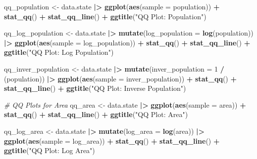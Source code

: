 \documentclass[
]{article}
\newenvironment{Shaded}{\begin{snugshade}}{\end{snugshade}}
\newcommand{\AttributeTok}[1]{\textcolor[rgb]{0.13,0.29,0.53}{#1}}
\newcommand{\CommentTok}[1]{\textcolor[rgb]{0.56,0.35,0.01}{\textit{#1}}}
\newcommand{\DecValTok}[1]{\textcolor[rgb]{0.00,0.00,0.81}{#1}}
\newcommand{\FunctionTok}[1]{\textcolor[rgb]{0.13,0.29,0.53}{\textbf{#1}}}
\newcommand{\NormalTok}[1]{#1}
\newcommand{\OtherTok}[1]{\textcolor[rgb]{0.56,0.35,0.01}{#1}}
\newcommand{\SpecialCharTok}[1]{\textcolor[rgb]{0.81,0.36,0.00}{\textbf{#1}}}
\newcommand{\StringTok}[1]{\textcolor[rgb]{0.31,0.60,0.02}{#1}}
\begin{document}
\begin{Shaded}
\begin{Highlighting}[]
\NormalTok{qq\_population }\OtherTok{\textless{}{-}}\NormalTok{ data.state }\SpecialCharTok{|\textgreater{}}
  \FunctionTok{ggplot}\NormalTok{(}\FunctionTok{aes}\NormalTok{(}\AttributeTok{sample =}\NormalTok{ population)) }\SpecialCharTok{+}
  \FunctionTok{stat\_qq}\NormalTok{() }\SpecialCharTok{+}
  \FunctionTok{stat\_qq\_line}\NormalTok{() }\SpecialCharTok{+}
  \FunctionTok{ggtitle}\NormalTok{(}\StringTok{"QQ Plot: Population"}\NormalTok{)}

\NormalTok{qq\_log\_population }\OtherTok{\textless{}{-}}\NormalTok{ data.state }\SpecialCharTok{|\textgreater{}}
  \FunctionTok{mutate}\NormalTok{(}\AttributeTok{log\_population =} \FunctionTok{log}\NormalTok{(population)) }\SpecialCharTok{|\textgreater{}}
  \FunctionTok{ggplot}\NormalTok{(}\FunctionTok{aes}\NormalTok{(}\AttributeTok{sample =}\NormalTok{ log\_population)) }\SpecialCharTok{+}
  \FunctionTok{stat\_qq}\NormalTok{() }\SpecialCharTok{+}
  \FunctionTok{stat\_qq\_line}\NormalTok{() }\SpecialCharTok{+}
  \FunctionTok{ggtitle}\NormalTok{(}\StringTok{"QQ Plot: Log Population"}\NormalTok{)}

\NormalTok{qq\_inver\_population }\OtherTok{\textless{}{-}}\NormalTok{ data.state }\SpecialCharTok{|\textgreater{}}
  \FunctionTok{mutate}\NormalTok{(}\AttributeTok{inver\_population =} \DecValTok{1} \SpecialCharTok{/}\NormalTok{ (population)) }\SpecialCharTok{|\textgreater{}}
  \FunctionTok{ggplot}\NormalTok{(}\FunctionTok{aes}\NormalTok{(}\AttributeTok{sample =}\NormalTok{ inver\_population)) }\SpecialCharTok{+}
  \FunctionTok{stat\_qq}\NormalTok{() }\SpecialCharTok{+}
  \FunctionTok{stat\_qq\_line}\NormalTok{() }\SpecialCharTok{+}
  \FunctionTok{ggtitle}\NormalTok{(}\StringTok{"QQ Plot: Inverse Population"}\NormalTok{)}

\CommentTok{\# QQ Plots for Area}
\NormalTok{qq\_area }\OtherTok{\textless{}{-}}\NormalTok{ data.state }\SpecialCharTok{|\textgreater{}}
  \FunctionTok{ggplot}\NormalTok{(}\FunctionTok{aes}\NormalTok{(}\AttributeTok{sample =}\NormalTok{ area)) }\SpecialCharTok{+}
  \FunctionTok{stat\_qq}\NormalTok{() }\SpecialCharTok{+}
  \FunctionTok{stat\_qq\_line}\NormalTok{() }\SpecialCharTok{+}
  \FunctionTok{ggtitle}\NormalTok{(}\StringTok{"QQ Plot: Area"}\NormalTok{)}

\NormalTok{qq\_log\_area }\OtherTok{\textless{}{-}}\NormalTok{ data.state }\SpecialCharTok{|\textgreater{}}
  \FunctionTok{mutate}\NormalTok{(}\AttributeTok{log\_area =} \FunctionTok{log}\NormalTok{(area)) }\SpecialCharTok{|\textgreater{}}
  \FunctionTok{ggplot}\NormalTok{(}\FunctionTok{aes}\NormalTok{(}\AttributeTok{sample =}\NormalTok{ log\_area)) }\SpecialCharTok{+}
  \FunctionTok{stat\_qq}\NormalTok{() }\SpecialCharTok{+}
  \FunctionTok{stat\_qq\_line}\NormalTok{() }\SpecialCharTok{+}
  \FunctionTok{ggtitle}\NormalTok{(}\StringTok{"QQ Plot: Log Area"}\NormalTok{)}


\end{Highlighting}
\end{Shaded}
\end{document}

